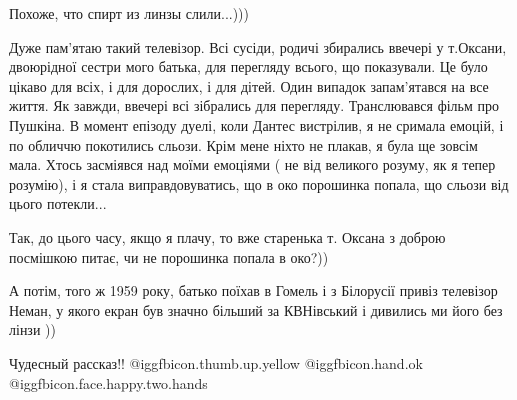 \begin{itemize}
Похоже, что спирт из линзы слили...)))


Дуже пам'ятаю такий телевізор. Всі сусіди, родичі збирались ввечері у т.Оксани,
двоюрідної сестри мого батька, для перегляду всього, що показували. Це було
цікаво для всіх, і для дорослих, і для дітей. Один випадок запам'ятався на все
життя. Як завжди, ввечері всі зібрались для перегляду. Транслювався фільм про
Пушкіна. В момент епізоду дуелі, коли Дантес вистрілив, я не сримала емоцій,
і по обличчю покотились сльози. Крім мене ніхто не плакав, я була ще зовсім
мала. Хтось засміявся над моїми емоціями ( не від великого розуму, як я тепер
розумію), і я стала виправдовуватись, що в око порошинка попала, що сльози від
цього потекли...

Так, до цього часу, якщо я плачу, то вже старенька т. Оксана з доброю посмішкою
питає, чи не порошинка попала в око?))

А потім, того ж 1959 року, батько поїхав в Гомель і з Білорусії привіз
телевізор Неман, у якого екран був значно більший за КВНівський і дивились ми
його без лінзи ))


Чудесный рассказ!!  @igg{fbicon.thumb.up.yellow}  @igg{fbicon.hand.ok}
@igg{fbicon.face.happy.two.hands} 

\end{itemize} %
